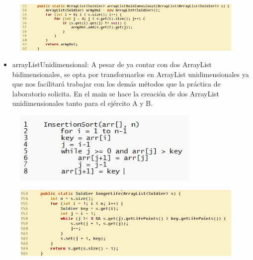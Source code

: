 \documentclass{article}
\begin{document}
	
	\begin{figure}[H]
		\centering
		\includegraphics[width=1.1\textwidth,keepaspectratio]{img/arrayListUni.jpg}
	\end{figure}
	
	\begin{itemize}	
		\item arrayListUnidimensional: A pesar de ya contar con dos ArrayList bidimensionales, se opta por transformarlos en ArrayList unidimensionales ya que nos facilitará trabajar con los demás métodos que la práctica de laboratorio solicita. En el main se hace la creación de dos ArrayList unidimensionales tanto para el ejército A y B.
	\end{itemize}
	
	\begin{figure}[H]
		\centering
		\includegraphics[width=0.8\textwidth,keepaspectratio]{img/insertion.jpg}
	\end{figure}
	
	\begin{figure}[H]
		\centering
		\includegraphics[width=1\textwidth,keepaspectratio]{img/longerLife.png}
	\end{figure}
	
\end{document}
